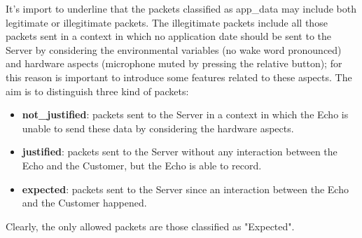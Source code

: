 \documentclass[sigconf]{acmart}
\begin{document}
    It's import to underline that the packets classified as app\_data may include both legitimate or illegitimate packets.
    The illegitimate packets include all those packets sent in a context in which no application date should be sent to the Server by considering the environmental variables (no wake word pronounced) and hardware aspects (microphone muted by pressing the relative button); for this reason is important to introduce some features related to these aspects.
    The aim is to distinguish three kind of packets:
    \begin{itemize}
        \item \textbf{not\_justified}: packets sent to the Server in a context in which the Echo is unable to send these data by considering the hardware aspects.
        \item \textbf{justified}: packets sent to the Server without any interaction between the Echo and the Customer, but the Echo is able to record.
        \item \textbf{expected}: packets sent to the Server since an interaction between the Echo and the Customer happened.
    \end{itemize}
    Clearly, the only allowed packets are those classified as "Expected".
\end{document}
